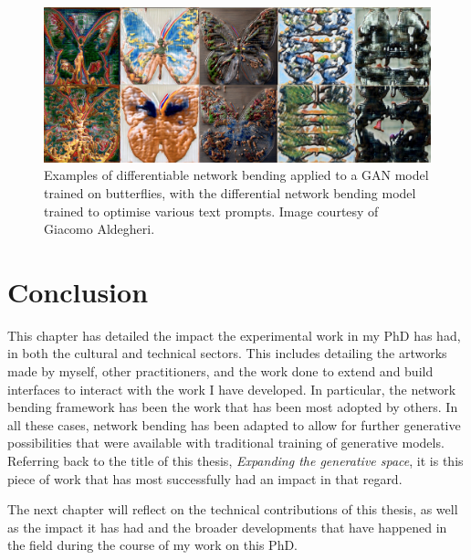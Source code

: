 \begin{figure}[!htb]
    \centering
    \captionsetup{justification=centering}
    \includegraphics[width=1\textwidth]{figures/c7_impact/net-bend-technical/diff-net-bend.png}
    \caption[Differential network bending]{Examples of differentiable network bending \citep{aldegheri2023hacking} applied to a GAN model trained on butterflies, with the differential network bending model trained to optimise various text prompts. Image courtesy of Giacomo Aldegheri.}
    \label{fig:c7:differential-net-bend}
\end{figure}


\section{Conclusion}

This chapter has detailed the impact the experimental work in my PhD has had, in both the cultural and technical sectors. 
This includes detailing the artworks made by myself, other practitioners, and the work done to extend and build interfaces to interact with the work I have developed. 
In particular, the network bending framework has been the work that has been most adopted by others. 
In all these cases, network bending has been adapted to allow for further generative possibilities that were available with traditional training of generative models. 
Referring back to the title of this thesis, \textit{Expanding the generative space}, it is this piece of work that has most successfully had an impact in that regard. 

The next chapter will reflect on the technical contributions of this thesis, as well as the impact it has had and the broader developments that have happened in the field during the course of my work on this PhD.
